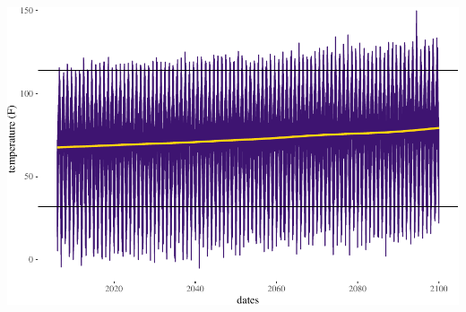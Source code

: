 \documentclass[
  paper=a4,
  ,captions=tableheading
]{scrartcl}
\begin{document}
\includegraphics{Haskell_files/figure-latex/unnamed-chunk-66-1.pdf}
\end{document}
